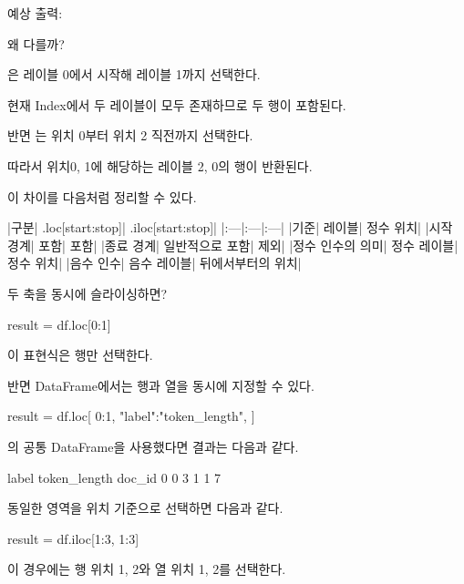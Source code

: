 예상 출력:

\begin{dhkzsh}
[0, 1]
[2, 0]
\end{dhkzsh}

왜 다를까?

은 레이블 0에서 시작해 레이블 1까지 선택한다.

현재 Index에서 두 레이블이 모두 존재하므로 두 행이 포함된다.

반면 는 위치 0부터 위치 2 직전까지 선택한다.

따라서 위치0, 1에 해당하는 레이블 2, 0의 행이 반환된다.

이 차이를 다음처럼 정리할 수 있다.

\begin{dhktable}
|구분|	.loc[start:stop]|	.iloc[start:stop]|
|:---|:---|:---|
|기준|	레이블|	정수 위치|
|시작 경계|	포함|	포함|
|종료 경계|	일반적으로 포함|	제외|
|정수 인수의 의미|	정수 레이블|	정수 위치|
|음수 인수|	음수 레이블|	뒤에서부터의 위치|
\end{dhktable}

\begin{dhknote}
\begin{dhksmry}[centered]
두 축을 동시에 슬라이싱하면?
\end{dhksmry}
\end{dhknote}

\begin{dhkcode}
result = df.loc[0:1]
\end{dhkcode}

이 표현식은 행만 선택한다.

반면 DataFrame에서는 행과 열을 동시에 지정할 수 있다.

\begin{dhkcode}
result = df.loc[
    0:1,
    "label":"token_length",
]
\end{dhkcode}

의 공통 DataFrame을 사용했다면 결과는 다음과 같다.

\begin{dhkzsh}
        label  token_length
doc_id
0           0             3
1           1             7
\end{dhkzsh}

동일한 영역을 위치 기준으로 선택하면 다음과 같다.

\begin{dhkcode}
result = df.iloc[1:3, 1:3]
\end{dhkcode}

이 경우에는 행 위치 1, 2와 열 위치 1, 2를 선택한다.

